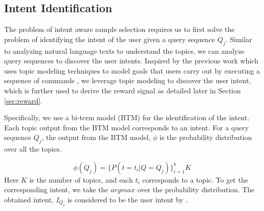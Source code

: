 \subsection{Intent Identification}
\label{sec:intent_identification}



The problem of intent aware sample selection requires us to first solve the problem of identifying the intent of the user given a query sequence $Q_j$. 
%
%
Similar to analyzing natural language texts to understand the topics, we can analyze query sequences to discover the user intents. Inspired by the previous work which uses topic modeling techniques to model goals
that users carry out by executing a sequence of commands \cite{aggarwal2020goal}, we leverage topic modeling to discover the user intent, which is further used to derive the reward signal as detailed later in Section \ref{sec:reward}. 



Specifically, we use a bi-term model (BTM) \cite{btm2013www} for the identification of the intent. Each topic output from the BTM model corresponds to an intent. For a query sequence $Q_j$, the output from the BTM model, \(\phi\) is the probability distribution over all the topics.

{\small
\begin{equation}
    \phi(Q_j) = \{P(t=t_i | Q=Q_j)\}_{i=1}^kK
\end{equation}
}
Here $K$ is the number of topics, and each $t_i$ corresponds to a topic. To get the corresponding intent, we take the $argmax$ over the probability distribution. The obtained intent, $I_{Q_j}$ is considered to be the user intent by \name{}.

